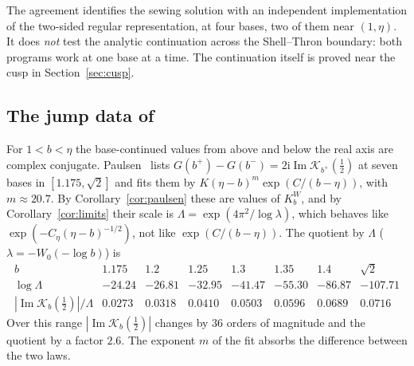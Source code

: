 \documentclass[11pt]{amsart}
\theoremstyle{definition}
\newcommand{\Kk}{K}
\newcommand{\ii}{\mathrm{i}}
\begin{document}
The agreement identifies the sewing solution with an independent implementation
of the two-sided regular representation, at four bases, two of them near
$(1,\eta)$.  It does \emph{not} test the analytic continuation across the
Shell--Thron boundary: both programs work at one base at a time.  The
continuation itself is proved near the cusp in Section~\ref{sec:cusp}.

\subsection{The jump data of~\cite{Paulsen2026}}\label{sec:jump}
For $1<b<\eta$ the base-continued values from above and below the real axis
are complex conjugate.  Paulsen~\cite[(29)]{Paulsen2026} lists
$G(b^+)-G(b^-)=2\ii\operatorname{Im}\mathcal K_{b^+}(\tfrac12)$ at seven bases in
$[1.175,\sqrt2]$ and fits them by $K(\eta-b)^m\exp(C/(b-\eta))$, with
$m\approx20.7$.  By Corollary~\ref{cor:paulsen} these are values of $\Kk^W_b$, and
by Corollary~\ref{cor:limits} their scale is $\Lambda=\exp(4\pi^2/\log\lambda)$,
which behaves like $\exp(-C_\eta(\eta-b)^{-1/2})$, not like $\exp(C/(b-\eta))$.
The quotient by $\Lambda$ ($\lambda=-W_0(-\log b)$) is
\[
\begin{array}{c|ccccccc}
 b & 1.175 & 1.2 & 1.25 & 1.3 & 1.35 & 1.4 & \sqrt2\\\hline
 \log\Lambda & -24.24 & -26.81 & -32.95 & -41.47 & -55.30 & -86.87 & -107.71\\
 |\operatorname{Im}\mathcal K_b(\tfrac12)|/\Lambda & 0.0273 & 0.0318 & 0.0410 & 0.0503 & 0.0596 & 0.0689 & 0.0716
\end{array}
\]
Over this range $|\operatorname{Im}\mathcal K_b(\tfrac12)|$ changes by $36$ orders of magnitude and the
quotient by a factor $2.6$.  The exponent $m$ of the fit absorbs the
difference between the two laws.
\end{document}
